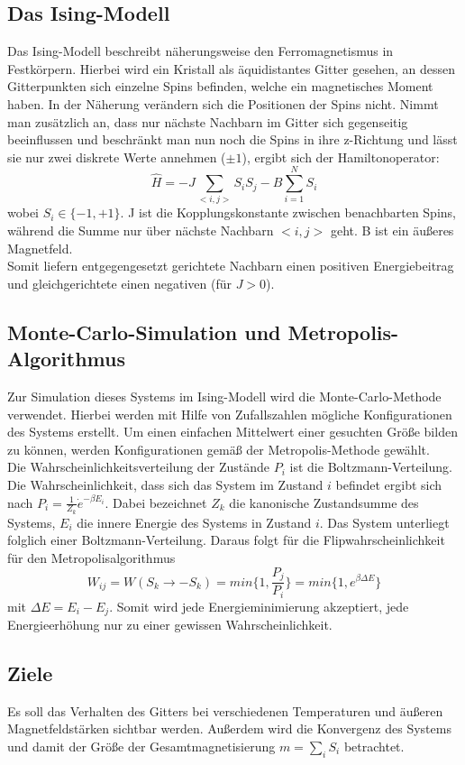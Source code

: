 \subsection{Das Ising-Modell}

Das Ising-Modell beschreibt näherungsweise den Ferromagnetismus in Festkörpern. Hierbei wird ein Kristall als äquidistantes Gitter gesehen, an dessen Gitterpunkten sich einzelne Spins befinden, welche ein magnetisches Moment haben. In der Näherung verändern sich die Positionen der Spins nicht. Nimmt man zusätzlich an, dass nur nächste Nachbarn im Gitter sich gegenseitig beeinflussen und beschränkt man nun noch die Spins in ihre z-Richtung und lässt sie nur zwei diskrete Werte annehmen ($\pm1$), ergibt sich der Hamiltonoperator:\\
\[
\hat{H}=-J\sum_{<i,j>} S_i S_j - B\sum_{i=1}^N S_i
\]
wobei $S_i \in \{-1,+1\}$. J ist die Kopplungskonstante zwischen benachbarten Spins, während die Summe nur über nächste Nachbarn $<i,j>$ geht. B ist ein äußeres Magnetfeld.\\
Somit liefern entgegengesetzt gerichtete Nachbarn einen positiven Energiebeitrag und gleichgerichtete einen negativen (für $J>0$).\\

\subsection{Monte-Carlo-Simulation und Metropolis-Algorithmus}
\label{theo2}
Zur Simulation dieses Systems im Ising-Modell wird die Monte-Carlo-Methode verwendet. Hierbei werden mit Hilfe von Zufallszahlen mögliche Konfigurationen des Systems erstellt. Um einen einfachen Mittelwert einer gesuchten Größe bilden zu können, werden Konfigurationen gemäß der Metropolis-Methode gewählt.\\
Die Wahrscheinlichkeitsverteilung der Zustände $P_i$ ist die Boltzmann-Verteilung. Die Wahrscheinlichkeit, dass sich das System im Zustand $i$ befindet ergibt sich nach $P_{i}=\frac{1}{Z_{k}}\dot e^{-\beta E_{i}}$. Dabei bezeichnet $Z_{k}$ die kanonische Zustandsumme des Systems, $E_{i}$ die innere Energie des Systems in Zustand $i$. Das System unterliegt folglich einer Boltzmann-Verteilung. Daraus folgt für die Flipwahrscheinlichkeit für den Metropolisalgorithmus
\begin{equation}
W_{ij}=W(S_k \rightarrow -S_k)=min\{1,\frac{P_{j}}{P_{i}}\}=min\{1,e^{\beta \Delta E}\}
\end{equation}
mit $\Delta E=E_{i}-E_{j}$. Somit wird jede Energieminimierung akzeptiert, jede Energieerhöhung nur zu einer gewissen Wahrscheinlichkeit.


\subsection{Ziele}

Es soll das Verhalten des Gitters bei verschiedenen Temperaturen und äußeren Magnetfeldstärken sichtbar werden. Außerdem wird die Konvergenz des Systems und damit der Größe der Gesamtmagnetisierung $m=\sum_i S_i$ betrachtet.